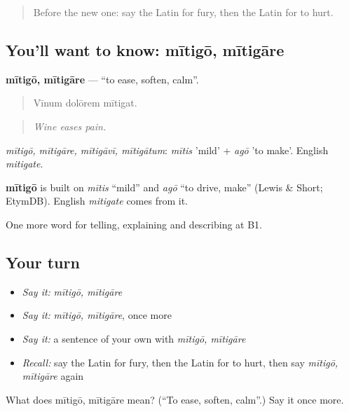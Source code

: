 \begin{quote}
Before the new one: say the Latin for fury, then the Latin for to hurt.
\end{quote}

\subsection*{You'll want to know: mītigō, mītigāre}
\textbf{mītigō, mītigāre} — \textquotedblleft{}to ease, soften, calm\textquotedblright{}.

\begin{quote}
Vīnum dolōrem mītigat.
\end{quote}

\begin{quote}
\emph{Wine eases pain.}
\end{quote}

\emph{mītigō, mītigāre, mītigāvī, mītigātum}: \emph{mītis} 'mild' + \emph{agō} 'to make'. English \emph{mitigate}.

\begin{cousinweb}
\textbf{mītigō} is built on \emph{mītis} \textquotedblleft{}mild\textquotedblright{} and \emph{agō} \textquotedblleft{}to drive, make\textquotedblright{} (Lewis \& Short; EtymDB). English \emph{mitigate} comes from it.
\end{cousinweb}

\begin{grammarlens}[title={What you've built}]
One more word for telling, explaining and describing at B1.
\end{grammarlens}

\subsection*{Your turn}
\begin{itemize}
\raggedright
  \item \emph{Say it:} \emph{mītigō, mītigāre}
  \item \emph{Say it:} \emph{mītigō, mītigāre}, once more
  \item \emph{Say it:} a sentence of your own with \emph{mītigō, mītigāre}
  \item \emph{Recall:} say the Latin for fury, then the Latin for to hurt, then say \emph{mītigō, mītigāre} again
\end{itemize}

\begin{tcolorbox}[breakable,colback=teal!4,colframe=teal!35!black,title={Before you move on}]
What does mītigō, mītigāre mean? (\textquotedblleft{}To ease, soften, calm\textquotedblright{}.) Say it once more.
\end{tcolorbox}
